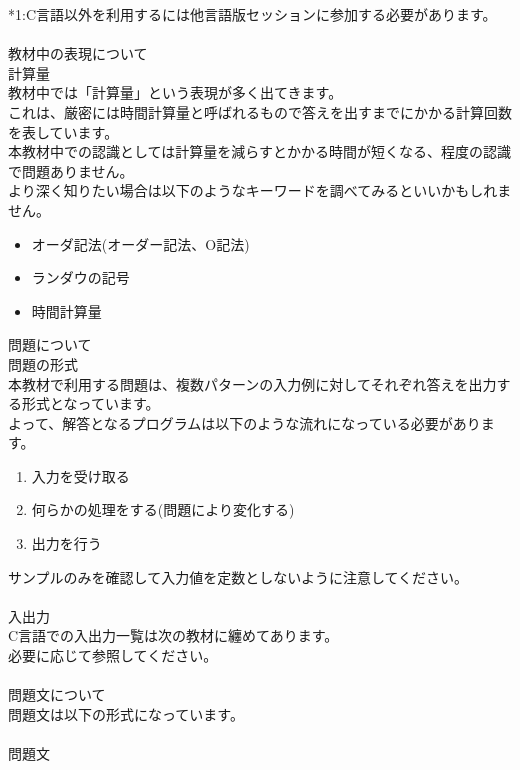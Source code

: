 \noindent
*1:C言語以外を利用するには他言語版セッションに参加する必要があります。
\\ \\ \noindent
{\LARGE 教材中の表現について}\\ 
{\Large 計算量}\\ 
教材中では「計算量」という表現が多く出てきます。\\
これは、厳密には時間計算量と呼ばれるもので答えを出すまでにかかる計算回数を表しています。\\
本教材中での認識としては計算量を減らすとかかる時間が短くなる、程度の認識で問題ありません。\\
より深く知りたい場合は以下のようなキーワードを調べてみるといいかもしれません。

\begin{itemize}
    \item オーダ記法(オーダー記法、O記法) 
    \item ランダウの記号
    \item 時間計算量
\end{itemize}

\clearpage
\noindent
{\LARGE 問題について}\\ 
{\Large 問題の形式}\\ 
本教材で利用する問題は、複数パターンの入力例に対してそれぞれ答えを出力する形式となっています。\\
よって、解答となるプログラムは以下のような流れになっている必要があります。

\begin{enumerate}
    \item 入力を受け取る
    \item 何らかの処理をする(問題により変化する)
    \item 出力を行う
\end{enumerate}

\noindent
サンプルのみを確認して入力値を定数としないように注意してください。
\\ \\ \noindent
{\Large 入出力}\\ 
C言語での入出力一覧は次の教材に纏めてあります。\\
必要に応じて参照してください。
\\ \\ \noindent
{\Large 問題文について}\\ 
問題文は以下の形式になっています。
\\ \\ \noindent
{\LARGE 問題文}\\ \hrulefill \\

